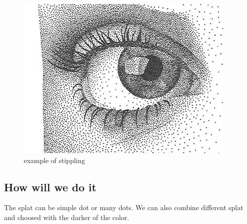 \documentclass[12pt]{article}
\begin{document}
\begin{figure}[!ht]
    \begin{center}
        \includegraphics[scale=0.5]{image/stippling.jpg}
        \caption{example of stippling}
    \end{center}
\end{figure}

\subsection*{How will we do it}

The splat can be simple dot or many dots. We can also combine different splat and choosed with the darker of the color.
\end{document}
